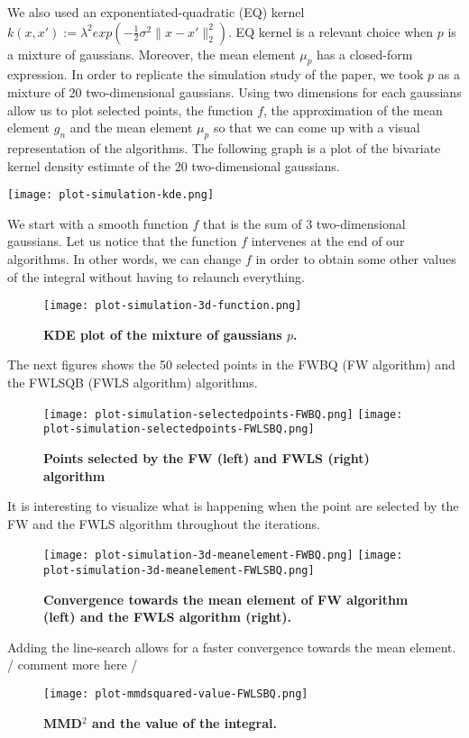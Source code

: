 We also used an exponentiated-quadratic (EQ) kernel $k(x, x') := \lambda^{2} exp(-\frac{1}{2}\sigma^{2} \| x-x' \|_{2}^{2} )$. EQ kernel is a relevant choice when $p$ is a mixture of gaussians. Moreover, the mean element $\mu_{p}$ has a closed-form expression.
In order to replicate the simulation study of the paper, we took $p$ as a mixture of 20 two-dimensional gaussians. Using two dimensions for each gaussians allow us to plot selected points, the function $f$, the approximation of the mean element $g_n$ and the mean element $\mu_{p}$ so that we can come up with a visual representation of the algorithms.
\newpage
The following graph is a plot of the bivariate kernel density estimate of the 20 two-dimensional gaussians. \\
\begin{center}
	\texttt{[image: plot-simulation-kde.png]}
\end{center}
\noindent
We start with a smooth function $f$ that is the sum of 3 two-dimensional gaussians. Let us notice that the function $f$ intervenes at the end of our algorithms. In other words, we can change $f$ in order to obtain some other values of the integral without having to relaunch everything.
\begin{figure}[H]
\begin{center}
	\texttt{[image: plot-simulation-3d-function.png]}
	\caption{\textbf{KDE plot of the mixture of gaussians $p$.}}
\end{center}
\end{figure}
\noindent
The next figures shows the 50 selected points in the FWBQ (FW algorithm) and the FWLSQB (FWLS algorithm) algorithms.
\begin{figure}[H]
\begin{center}
	\texttt{[image: plot-simulation-selectedpoints-FWBQ.png]}
	\texttt{[image: plot-simulation-selectedpoints-FWLSBQ.png]}
	\caption{\textbf{Points selected by the FW (left) and FWLS (right) algorithm}}
\end{center}
\end{figure}
\noindent
It is interesting to visualize what is happening when the point are selected by the FW and the FWLS algorithm throughout the iterations.
\begin{figure}[H]
\begin{center}
	\texttt{[image: plot-simulation-3d-meanelement-FWBQ.png]}
	\texttt{[image: plot-simulation-3d-meanelement-FWLSBQ.png]}
	\caption{\textbf{Convergence towards the mean element of FW algorithm (left) and the FWLS algorithm (right).}}
\end{center}
\end{figure}
\noindent
Adding the line-search allows for a faster convergence towards the mean element. / comment more here /
\begin{figure}[H]
\begin{center}
	\texttt{[image: plot-mmdsquared-value-FWLSBQ.png]}
	\caption{\textbf{MMD$^2$ and the value of the integral.}}
\end{center}
\end{figure}
\noindent

